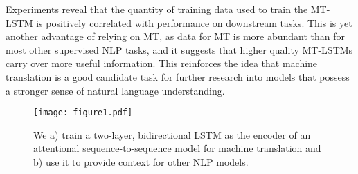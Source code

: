 Experiments reveal that the quantity of training data used to train the MT-LSTM is positively correlated with performance on downstream tasks. 
This is yet another advantage of relying on MT, 
as data for MT is more abundant than for most other supervised NLP tasks, 
and it suggests that higher quality MT-LSTMs carry over more useful information.
This reinforces the idea that machine translation is a good candidate task for further research into models that possess a stronger sense of natural language understanding.

\begin{figure}
  \centering
 \texttt{[image: figure1.pdf]}
  \caption{We a) train a two-layer, bidirectional LSTM as the encoder of an attentional sequence-to-sequence model for machine translation and b) use it to provide context for other NLP models.
  }\label{fig1}
  \vspace{-0.3cm}
\end{figure}